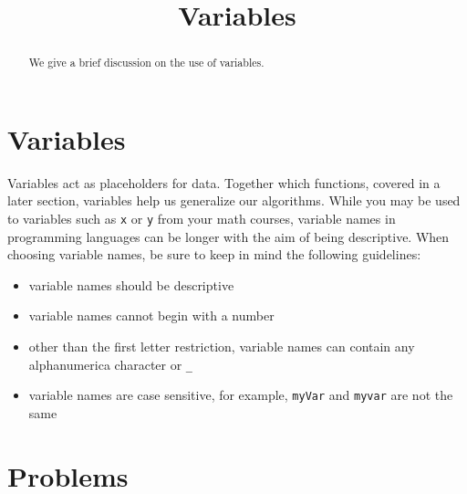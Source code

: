 \documentclass{ximera}
\title{Variables}
\begin{document}
  
\begin{abstract}  
We give a brief discussion on the use of variables.
\end{abstract}  
\maketitle

\section{Variables}

Variables act as placeholders for data. Together which functions, covered in a later section, variables help us generalize our algorithms. While you may be used to variables such as \verb|x| or \verb|y| from your math courses, variable names in programming languages can be longer with the aim of being descriptive. When choosing variable names, be sure to keep in mind the following guidelines:

\begin{itemize}
	\item variable names should be descriptive
	\item variable names cannot begin with a number
	\item other than the first letter restriction, variable names can contain any alphanumerica character or \verb|_|
	\item variable names are case sensitive, for example, \verb|myVar| and \verb|myvar| are not the same
\end{itemize}


\section{Problems}

\begin{question}
\end{question}

\begin{question}
\end{question}
\end{document}
